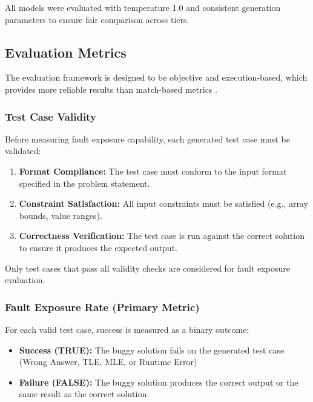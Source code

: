 All models were evaluated with temperature 1.0 and consistent generation parameters to ensure fair comparison across tiers.

\subsection{Evaluation Metrics}

The evaluation framework is designed to be objective and execution-based, which provides more reliable results than match-based metrics \cite{chen2021evaluating, haque2023fixeval}.

\subsubsection{Test Case Validity}

Before measuring fault exposure capability, each generated test case must be validated:

\begin{enumerate}
    \item \textbf{Format Compliance:} The test case must conform to the input format specified in the problem statement.
    \item \textbf{Constraint Satisfaction:} All input constraints must be satisfied (e.g., array bounds, value ranges).
    \item \textbf{Correctness Verification:} The test case is run against the correct solution to ensure it produces the expected output.
\end{enumerate}

Only test cases that pass all validity checks are considered for fault exposure evaluation.

\subsubsection{Fault Exposure Rate (Primary Metric)}

For each valid test case, success is measured as a binary outcome:

\begin{itemize}
    \item \textbf{Success (TRUE):} The buggy solution fails on the generated test case (Wrong Answer, TLE, MLE, or Runtime Error)
    \item \textbf{Failure (FALSE):} The buggy solution produces the correct output or the same result as the correct solution
\end{itemize}

